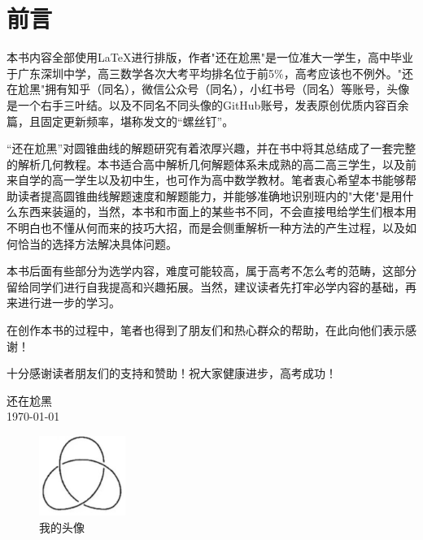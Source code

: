 \documentclass[12pt,a4paper, oneside,UTF8]{ctexbook}
\begin{document}

\frontmatter
\pagestyle{frontmatter} %
\chapter*{前言}
本书内容全部使用\LaTeX{}进行排版，作者"还在尬黑"是一位准大一学生，高中毕业于广东深圳中学，高三数学各次大考平均排名位于前5\%，高考应该也不例外。"还在尬黑"拥有知乎（同名），微信公众号（同名），小红书号（同名）等账号，头像是一个右手三叶结。以及不同名不同头像的GitHub账号，发表原创优质内容百余篇，且固定更新频率，堪称发文的“螺丝钉”。

“还在尬黑”对圆锥曲线的解题研究有着浓厚兴趣，并在书中将其总结成了一套完整的解析几何教程。本书适合高中解析几何解题体系未成熟的高二高三学生，以及前来自学的高一学生以及初中生，也可作为高中数学教材。笔者衷心希望本书能够帮助读者提高圆锥曲线解题速度和解题能力，并能够准确地识别班内的"大佬"是用什么东西来装逼的，当然，本书和市面上的某些书不同，不会直接甩给学生们根本用不明白也不懂从何而来的技巧大招，而是会侧重解析一种方法的产生过程，以及如何恰当的选择方法解决具体问题。

本书后面有些部分为选学内容，难度可能较高，属于高考不怎么考的范畴，这部分留给同学们进行自我提高和兴趣拓展。当然，建议读者先打牢必学内容的基础，再来进行进一步的学习。

在创作本书的过程中，笔者也得到了朋友们和热心群众的帮助，在此向他们表示感谢！

十分感谢读者朋友们的支持和赞助！祝大家健康进步，高考成功！
\begin{flushright}
    \vspace{2\baselineskip} %
    \kt 还在尬黑 \\ %
    \today
\end{flushright}
\begin{figure}[htbp]
	\centering
    \includegraphics[width=0.25\textwidth]{flg/logo.png}%
	\caption{我的头像}
	\label{fig0-1}
\end{figure}

\newpage
{}%
\tableofcontents
\thispagestyle{tocmatter} 
\mainmatter
\pagestyle{mainmatter} %



\end{document}

